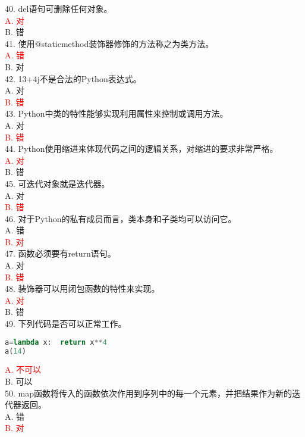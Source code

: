 \documentclass[6pt]{article}
\begin{document}
40. del语句可删除任何对象。\\

\textcolor{red}{A. 对}\\
B. 错\\


41. 使用@staticmethod装饰器修饰的方法称之为类方法。\\

\textcolor{red}{A. 错}\\
B. 对\\


42. 13+4j不是合法的Python表达式。\\

A. 对\\
\textcolor{red}{B. 错}\\

43. Python中类的特性能够实现利用属性来控制或调用方法。\\

A. 对\\
\textcolor{red}{B. 错}\\

44. Python使用缩进来体现代码之间的逻辑关系，对缩进的要求非常严格。\\

\textcolor{red}{A. 对}\\
B. 错\\

45. 可迭代对象就是迭代器。\\

A. 对\\
\textcolor{red}{B. 错}\\

46. 对于Python的私有成员而言，类本身和子类均可以访问它。\\

A. 错\\
\textcolor{red}{B. 对}\\


47. 函数必须要有return语句。\\

A. 对\\
\textcolor{red}{B. 错}\\

48. 装饰器可以用闭包函数的特性来实现。\\

\textcolor{red}{A. 对}\\
B. 错\\

49. 下列代码是否可以正常工作。\\
\begin{lstlisting}[language=Python]
a=lambda x:  return x**4
a(14)
\end{lstlisting}

\textcolor{red}{A. 不可以}\\
B. 可以\\

  
50. map函数将传入的函数依次作用到序列中的每一个元素，并把结果作为新的迭代器返回。\\

A. 错\\
\textcolor{red}{B. 对}\\
\end{document}
